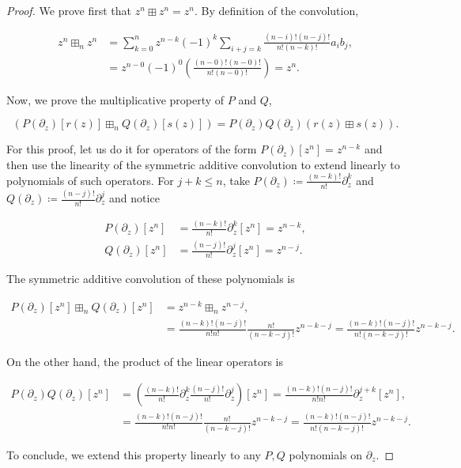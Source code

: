 \begin{proof}
    We prove first that $z^n \boxplus z^n = z^n$. By definition of the convolution,
    
    \begin{align*}
        z^n \boxplus_n z^n &= \sum_{k=0}^n z^{n-k}(-1)^k \sum_{i+j = k} \frac{(n-i)!(n-j)!}{n!(n-k)!}a_i b_j, \\
        &= z^{n-0}(-1)^0\left( \frac{(n-0)!(n-0)!}{n!(n-0)!}\right) = z^n.
    \end{align*}

    Now, we prove the multiplicative property of $P$ and $Q$,

    \begin{equation*}
        \left( P(\partial_z)[r(z)] \boxplus_n Q(\partial_z)[s(z)] \right) = P(\partial_z) Q(\partial_z)(r(z) \boxplus s(z)).
    \end{equation*}

    For this proof, let us do it for operators of the form $P(\partial_z)[z^n] = z^{n-k}$ and then use the linearity of the symmetric additive convolution to extend linearly to polynomials of such operators. For $j+k\le n$, take $P(\partial_z) \coloneqq \frac{(n-k)!}{n!}\partial_z^k$ and $Q(\partial_z) \coloneqq \frac{(n-j)!}{n!}\partial_z^j$ and notice

    \begin{align*}
        P(\partial_z)[z^n] &= \frac{(n-k)!}{n!} \partial_z^k[z^n] = z^{n-k},\\
        Q(\partial_z)[z^n] &= \frac{(n-j)!}{n!} \partial_z^j[z^n] = z^{n-j}.
    \end{align*}

    The symmetric additive convolution of these polynomials is 

    \begin{align*}
        P(\partial_z)[z^n] \boxplus_n Q(\partial_z)[z^n] &= z^{n-k}\boxplus_n z^{n-j},\\
        &= \frac{(n-k)!(n-j)!}{n!n!}\frac{n!}{(n-k-j)!}z^{n-k-j} = \frac{(n-k)!(n-j)!}{n!(n-k-j)!}z^{n-k-j}.
    \end{align*}

    On the other hand, the product of the linear operators is 

    \begin{align*}
        P(\partial_z)Q(\partial_z)[z^n] &= \left(\frac{(n-k)!}{n!}\partial_z^k \frac{(n-j)!}{n!}\partial_z^j\right)[z^n] = \frac{(n-k)!(n-j)!}{n!n!} \partial_z^{j+k}[z^n], \\
        &= \frac{(n-k)!(n-j)!}{n!n!} \frac{n!}{(n-k-j)!}z^{n-k-j} = \frac{(n-k)!(n-j)!}{n!(n-k-j)!}z^{n-k-j}.
    \end{align*}

    To conclude, we extend this property linearly to any $P,Q$ polynomials on $\partial_z$. 
\end{proof}

